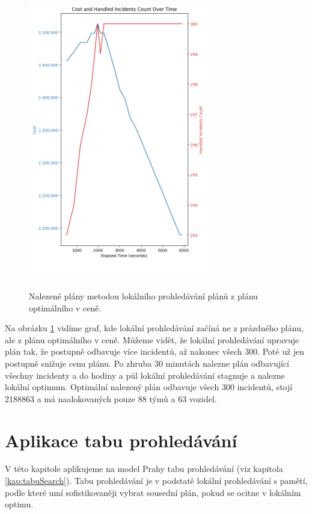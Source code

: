 \begin{figure}[H]
  \caption{Nalezené plány metodou lokálního prohledávání plánů z plánu optimálního v ceně.}
  \includegraphics[width=0.7\textwidth,height=0.9\textwidth]{img/plots/localSearch_fromOptimal.png}
  \centering
  \label{img:hybrid}
\end{figure}

Na obrázku \ref{img:hybrid} vidíme graf, kde lokální prohledávání začíná ne z prázdného plánu, ale z plánu optimálního v ceně.
Můžeme vidět, že lokální prohledávání upravuje plán tak, že postupně odbavuje více incidentů, až nakonec všech 300. Poté už jen postupně snižuje cenu plánu.
Po zhruba 30 minutách nalezne plán odbavující všechny incidenty a do hodiny a půl lokální prohledávání stagnuje a nalezne lokální optimum.
Optimální nalezený plán odbavuje všech 300 incidentů, stojí 2188863 a má naalokovaných pouze 88 týmů a 63 vozidel.

\section{Aplikace tabu prohledávání}

V této kapitole aplikujeme na model Prahy tabu prohledávání (viz kapitola \ref{kap:tabuSearch}).
Tabu prohledávání je v podstatě lokální prohledávání s pamětí, podle které umí sofistikovaněji vybrat sousední plán,
pokud se ocitne v lokálním optimu.

